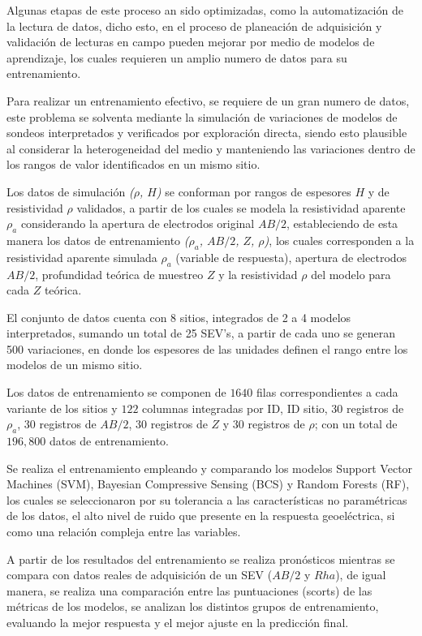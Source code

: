 Algunas etapas de este proceso an sido optimizadas, como la automatización de la lectura de datos, dicho esto, en el proceso de planeación de adquisición y validación de lecturas en campo pueden mejorar por medio de modelos de aprendizaje, los cuales requieren un amplio numero de datos para su entrenamiento.

Para realizar un entrenamiento efectivo, se requiere de un gran numero de datos, este problema se solventa mediante la simulación de variaciones de modelos de sondeos interpretados y verificados por exploración directa, siendo esto plausible al considerar la heterogeneidad del medio y manteniendo las variaciones dentro de los rangos de valor identificados en un mismo sitio.

Los datos de simulación \textit{($\rho$, $H$)} se conforman por rangos de espesores $H$ y de resistividad $\rho$ validados, a partir de los cuales se modela la resistividad aparente $\rho _{a}$ considerando la apertura de electrodos original $AB/2$, estableciendo de esta manera los datos de entrenamiento \textit{($\rho _{a}$, $AB/2$, $Z$, $\rho$)}, los cuales corresponden a la resistividad aparente simulada $\rho _{a}$ (variable de respuesta), apertura de electrodos $AB/2$, profundidad teórica de muestreo $Z$ y la resistividad $\rho$ del modelo para cada $Z$ teórica.  

El conjunto de datos cuenta con 8 sitios, integrados de 2 a 4 modelos interpretados, sumando un total de 25 SEV's, a partir de cada uno se generan 500 variaciones, en donde los espesores de las unidades definen el rango entre los modelos de un mismo sitio. 

Los datos de entrenamiento se componen de $1640$ filas correspondientes a cada variante de los sitios y $122$ columnas integradas por ID, ID sitio, 30 registros de $\rho _{a}$, 30 registros de $AB/2$, 30 registros de $Z$ y 30 registros de $\rho$; con un total de $196,800$ datos de entrenamiento.

Se realiza el entrenamiento empleando y comparando los modelos Support Vector Machines (SVM), Bayesian Compressive Sensing (BCS) y Random Forests (RF), los cuales se seleccionaron por su tolerancia a las características no paramétricas de los datos, el alto nivel de ruido que presente en la respuesta geoeléctrica, si como una relación compleja entre las variables.%

A partir de los resultados del entrenamiento se realiza pronósticos mientras se compara con datos reales de adquisición de un SEV ($AB/2$ y $Rha$), de igual manera, se realiza una comparación entre las puntuaciones (scorts) de las métricas de los modelos, se analizan los distintos grupos de entrenamiento, evaluando la mejor respuesta y el mejor ajuste en la predicción final.

